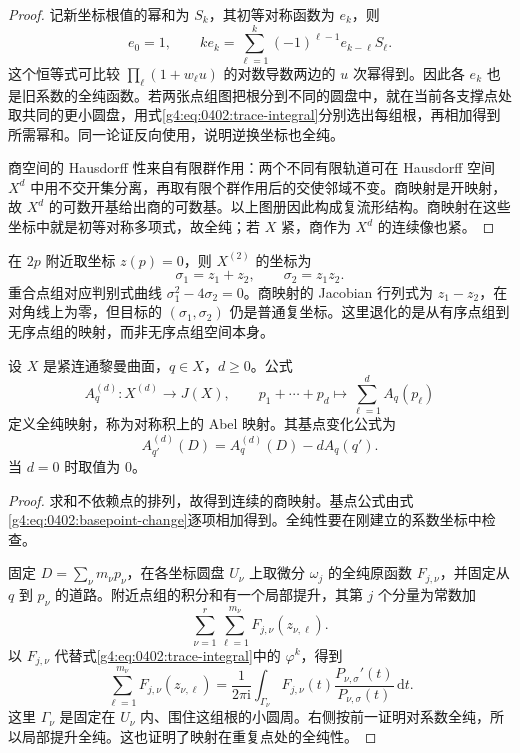\begin{proof}
	记新坐标根值的幂和为 \(S_k\)，其初等对称函数为 \(e_k\)，则
	\[
		e_0=1,\qquad
		k e_k=\sum_{\ell=1}^k(-1)^{\ell-1}e_{k-\ell}S_\ell.
	\]
	这个恒等式可比较 \(\prod_\ell(1+w_\ell u)\) 的对数导数两边的 \(u\) 次幂得到。因此各 \(e_k\) 也是旧系数的全纯函数。若两张点组图把根分到不同的圆盘中，就在当前各支撑点处取共同的更小圆盘，用式\eqref{g4:eq:0402:trace-integral}分别选出每组根，再相加得到所需幂和。同一论证反向使用，说明逆换坐标也全纯。

	商空间的 Hausdorff 性来自有限群作用：两个不同有限轨道可在 Hausdorff 空间 \(X^d\) 中用不交开集分离，再取有限个群作用后的交使邻域不变。商映射是开映射，故 \(X^d\) 的可数开基给出商的可数基。以上图册因此构成复流形结构。商映射在这些坐标中就是初等对称多项式，故全纯；若 \(X\) 紧，商作为 \(X^d\) 的连续像也紧。
\end{proof}

\begin{example}
	\label{g4:exm:0402:double-point}
	在 \(2p\) 附近取坐标 \(z(p)=0\)，则 \(X^{(2)}\) 的坐标为
	\[
		\sigma_1=z_1+z_2,\qquad \sigma_2=z_1z_2.
	\]
	重合点组对应判别式曲线 \(\sigma_1^2-4\sigma_2=0\)。商映射的 Jacobian 行列式为 \(z_1-z_2\)，在对角线上为零，但目标的 \((\sigma_1,\sigma_2)\) 仍是普通复坐标。这里退化的是从有序点组到无序点组的映射，而非无序点组空间本身。
\end{example}

\begin{proposition}
	\label{g4:prop:0402:symmetric-abel}
	设 \(X\) 是紧连通黎曼曲面，\(q\in X\)，\(d\ge0\)。公式
	\begin{equation}\label{g4:eq:0402:symmetric-abel}
		A_q^{(d)}:X^{(d)}\longrightarrow J(X),
		\qquad p_1+\cdots+p_d\longmapsto\sum_{\ell=1}^d A_q(p_\ell)
	\end{equation}
	定义全纯映射，称为对称积上的 Abel 映射。其基点变化公式为
	\[
		A_{q'}^{(d)}(D)=A_q^{(d)}(D)-dA_q(q').
	\]
	当 \(d=0\) 时取值为 \(0\)。
\end{proposition}
\begin{proof}
	求和不依赖点的排列，故得到连续的商映射。基点公式由式\eqref{g4:eq:0402:basepoint-change}逐项相加得到。全纯性要在刚建立的系数坐标中检查。

	固定 \(D=\sum_\nu m_\nu p_\nu\)，在各坐标圆盘 \(U_\nu\) 上取微分 \(\omega_j\) 的全纯原函数 \(F_{j,\nu}\)，并固定从 \(q\) 到 \(p_\nu\) 的道路。附近点组的积分和有一个局部提升，其第 \(j\) 个分量为常数加
	\[
		\sum_{\nu=1}^r\sum_{\ell=1}^{m_\nu}
		F_{j,\nu}(z_{\nu,\ell}).
	\]
	以 \(F_{j,\nu}\) 代替式\eqref{g4:eq:0402:trace-integral}中的 \(\varphi^k\)，得到
	\[
		\sum_{\ell=1}^{m_\nu}F_{j,\nu}(z_{\nu,\ell})
		=\frac{1}{2\pi\mathrm{i}}\int_{\Gamma_\nu}
		F_{j,\nu}(t)\frac{P_{\nu,\sigma}'(t)}
		{P_{\nu,\sigma}(t)}\,\mathrm{d}t.
	\]
	这里 \(\Gamma_\nu\) 是固定在 \(U_\nu\) 内、围住这组根的小圆周。右侧按前一证明对系数全纯，所以局部提升全纯。这也证明了映射在重复点处的全纯性。
\end{proof}

